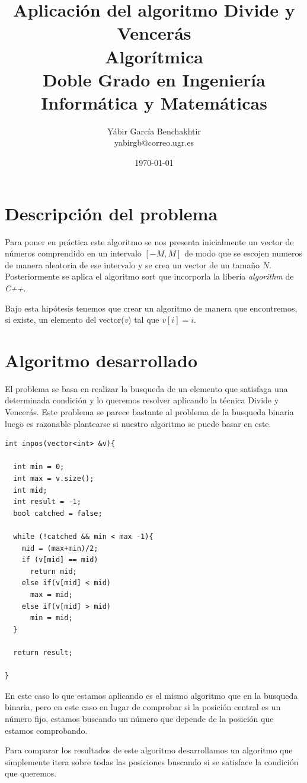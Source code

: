 \documentclass{article}
\title{Aplicación del algoritmo Divide y Vencerás \\[5mm]
  \Large Algorítmica\\
  \normalsize Doble Grado en Ingeniería Informática y Matemáticas\\[5cm]
}
\author{Yábir García Benchakhtir \\ yabirgb@correo.ugr.es \\[10cm]}
\date{\today}
\begin{document}
\maketitle

\section{Descripción del problema}

Para poner en práctica este algoritmo se nos presenta inicialmente un
vector de números comprendido en un intervalo $[-M, M]$ de modo que se
escojen numeros de manera aleatoria de ese intervalo y se crea un
vector de un tamaño $N$. Posteriormente se aplica el algoritmo sort
que incorporla la libería \textit{algorithm} de \textit{C++}.

Bajo esta hipótesis tenemos que crear un algoritmo de manera que
encontremos, si existe, un elemento del vector(\textit{v}) tal que
$v[i] = i$.

\section{Algoritmo desarrollado}

El problema se basa en realizar la busqueda de un elemento que
satisfaga una determinada condición y lo queremos resolver aplicando
la técnica Divide y Vencerás. Este problema se parece bastante al
problema de la busqueda binaria luego es razonable plantearse si
nuestro algoritmo se puede basar en este.

\begin{lstlisting}
int inpos(vector<int> &v){
  
  int min = 0;
  int max = v.size();
  int mid;
  int result = -1;
  bool catched = false;
  
  while (!catched && min < max -1){
    mid = (max+min)/2;
    if (v[mid] == mid)
      return mid;
    else if(v[mid] < mid)
      max = mid;
    else if(v[mid] > mid)
      min = mid; 
  }

  return result;
   
}
\end{lstlisting}

En este caso lo que estamos aplicando es el mismo algoritmo que en la
busqueda binaria, pero en este caso en lugar de comprobar si la
posición central es un número fijo, estamos buscando un número que
depende de la posición que estamos comprobando.

Para comparar los resultados de este algoritmo desarrollamos un
algoritmo que simplemente itera sobre todas las posiciones buscando si
se satisface la condición que queremos.
\end{document}
